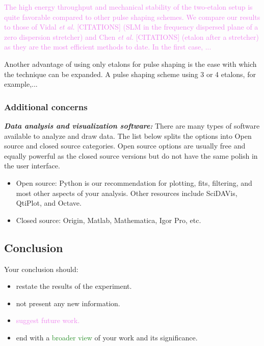 \documentclass[12pt]{article}
\begin{document}
\textcolor{violet}{The high energy throughput and mechanical stability
  of the two-etalon setup is quite favorable compared to other pulse
  shaping schemes. We compare our results to those of Vidal \textit{et
    al.} [CITATIONS] (SLM in the frequency dispersed plane of a zero
  dispersion stretcher) and Chen \textit{et al.} [CITATIONS] (etalon
  after a stretcher) as they are the most efficient methods to
  date. In the first case, ...}

\textcolor{Sepia}{Another advantage of using only etalons for pulse
  shaping is the ease with which the technique can be expanded. A
  pulse shaping scheme using 3 or 4 etalons, for example,...}

\subsubsection{Additional concerns}

\textit{\textbf{Data analysis and visualization software:}} There are many
types of software available to analyze and draw data. The list below splits
the options into Open source and closed source categories. Open source
options are usually free and equally powerful as the closed source versions
but do not have the same polish in the user interface.

\begin{itemize}[label=-]
 \item Open source: Python is our recommendation for plotting, fits, filtering, and most other aspects of your analysis. Other resources include SciDAVis, QtiPlot, and Octave.
 \item Closed source: Origin, Matlab, Mathematica, Igor Pro, etc.
\end{itemize}

\newpage

\subsection{Conclusion}
\label{sec:Conclusion}

Your conclusion should:

\begin{itemize}
\item \textcolor{BurntOrange}{restate} the results of the experiment.
\item not present any new information.
\item \textcolor{violet}{suggest future work.}
\item end with a \textcolor{ForestGreen}{broader view} of your work
  and its significance.
\end{itemize}
\end{document}
